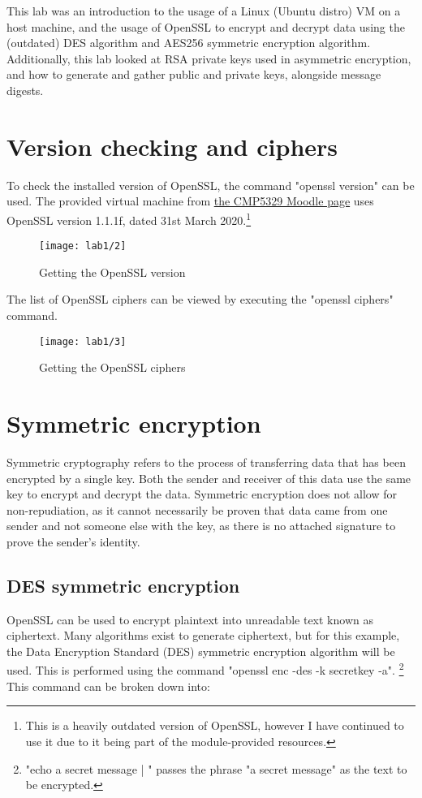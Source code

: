 \usepackage{stmaryrd}This lab was an introduction to the usage of a Linux (Ubuntu distro) VM on a host machine, and the usage of OpenSSL to
encrypt and decrypt data using the (outdated) DES algorithm and AES256 symmetric encryption algorithm.
Additionally, this lab looked at RSA private keys used in asymmetric encryption, and how to generate and gather
public and private keys, alongside message digests.

\section{Version checking and ciphers}\label{sec:version}
To check the installed version of OpenSSL, the command "openssl version" can be used.
The provided virtual machine from \href{https://moodle.bcu.ac.uk/mod/url/view.php?id=7914090}{the CMP5329 Moodle page}
uses OpenSSL version 1.1.1f, dated 31st March 2020.\footnote{This is a heavily outdated version of OpenSSL,
    however I have continued to use it due to it being part of the module-provided resources.}

\begin{figure}[H]
    \centering
    \texttt{[image: lab1/2]}
    \caption{Getting the OpenSSL version}
    \label{fig:version}
\end{figure}

The list of OpenSSL ciphers can be viewed by executing the "openssl ciphers" command.

\begin{figure}[H]
    \centering
    \texttt{[image: lab1/3]}
    \caption{Getting the OpenSSL ciphers}
    \label{fig:ciphers}
\end{figure}

\section{Symmetric encryption}\label{sec:symmEncrypt}
Symmetric cryptography refers to the process of transferring data that has been encrypted by a single key.
Both the sender and receiver of this data use the same key to encrypt and decrypt the data.
Symmetric encryption does not allow for non-repudiation, as it cannot necessarily be proven that data came
from one sender and not someone else with the key, as there is no attached signature to prove the sender's
identity.

\subsection{DES symmetric encryption}\label{subsec:des}
OpenSSL can be used to encrypt plaintext into unreadable text known as ciphertext.
Many algorithms exist to generate ciphertext, but for this example, the Data Encryption Standard (DES)
symmetric encryption algorithm will be used.
This is performed using the command \newline"openssl enc -des -k secretkey -a".
\footnote{"echo a secret message | " passes the phrase "a secret message" as the text to be encrypted.}
This command can be broken down into:

